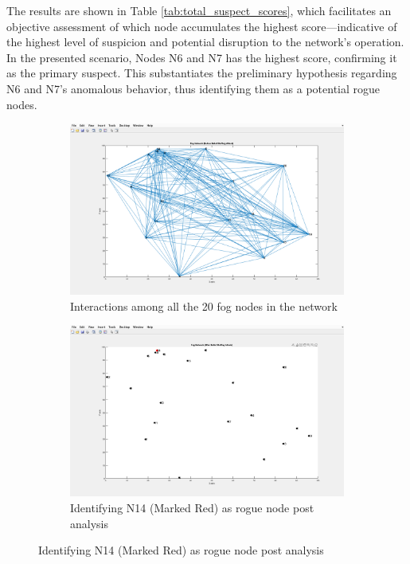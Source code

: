 \documentclass{sn-jnl}%
\begin{document}
\begin{itemize}
The results are shown in Table \ref{tab:total_suspect_scores}, which facilitates an objective assessment of which node accumulates the highest score—indicative of the highest level of suspicion and potential disruption to the network’s operation. In the presented scenario, Nodes N6 and N7 has the highest score, confirming it as the primary suspect. This substantiates the preliminary hypothesis regarding N6 and N7's anomalous behavior, thus identifying them as a potential rogue nodes.
\begin{figure}
    \centering
    \begin{subfigure}[b]{0.8\textwidth}
        \includegraphics[width=\textwidth]{bst/images/10.png}
        \caption{Interactions among all the 20 fog nodes in the network}
        \label{fig:sub1}
    \end{subfigure}
    \hfill
    \begin{subfigure}[b]{0.8\textwidth}
        \includegraphics[width=\textwidth]{bst/images/12.png}
        \caption{Identifying N14 (Marked Red) as rogue node post analysis}

\end{subfigure}
\end{figure}
\end{itemize}
\end{document}

